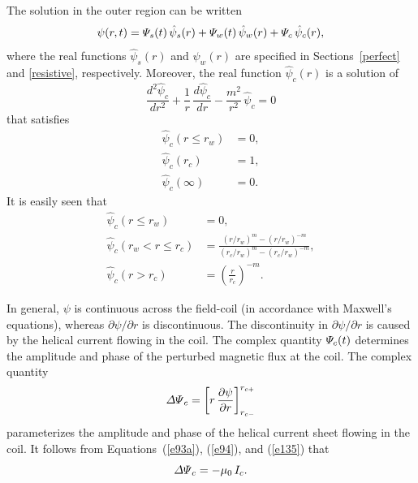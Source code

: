 \documentclass[notitlepage,12pt]{article}
\begin{document}
The solution in the outer region can be written
\begin{equation}
\psi(r,t) = {\mit\Psi}_s(t)\,\hat{\psi}_s(r) + {\mit\Psi}_w(t)\,\hat{\psi}_w(r) + {\mit\Psi}_c\,\hat{\psi}_c(r),
\end{equation}
where the real functions $\hat{\psi}_s(r)$ and $\hat{\psi}_w(r)$ are specified in Sections~\ref{perfect} and \ref{resistive}, respectively. 
Moreover, 
the real function  $\hat{\psi}_c(r)$ is a solution of 
\begin{equation}\label{e100b}
\frac{d^2\hat{\psi}_c}{dr^2} + \frac{1}{r}\,\frac{d\hat{\psi}_c}{dr}-\frac{m^2}{r^2}\,\hat{\psi}_c=  0
\end{equation}
that satisfies
\begin{align}
\hat{\psi}_c(r\leq r_w) &= 0,\\[0.5ex]
\hat{\psi}_c(r_c) &= 1,\\[0.5ex]
\hat{\psi}_c(\infty) &= 0.
\end{align}
It is easily seen that
\begin{align}
\hat{\psi}_c(r\leq r_w) &= 0,\\[0.5ex]
\hat{\psi}_c(r_w<r \leq r_c) &= \frac{(r/r_w)^m-(r/r_w)^{-m}}{(r_c/r_w)^m - (r_c/r_w)^{-m}},\label{e142}\\[0.5ex]
\hat{\psi}_c(r> r_c) &=\left(\frac{r}{r_c}\right)^{-m}.\label{e143}
\end{align}

In general, $\psi$ is continuous across the field-coil (in accordance with Maxwell's equations), whereas $\partial\psi/\partial r$ is discontinuous. The discontinuity in $\partial\psi/\partial r$ is caused by the helical current flowing in the coil. The complex quantity ${\mit\Psi}_c(t)$ determines the amplitude and
phase of the perturbed magnetic flux at the coil. The complex quantity
\begin{equation}\label{e118a}
{\mit\Delta\Psi}_c = \left[r\,\frac{\partial\psi}{\partial r}\right]_{r_{c-}}^{r_{c+}}
\end{equation}
parameterizes the amplitude and phase of the helical  current sheet flowing in the coil.
It follows from Equations~(\ref{e93a}), (\ref{e94}), and (\ref{e135})  that
\begin{equation}\label{e145}
{\mit\Delta\Psi}_c = -\mu_0\,I_c.
\end{equation}
\end{document}

